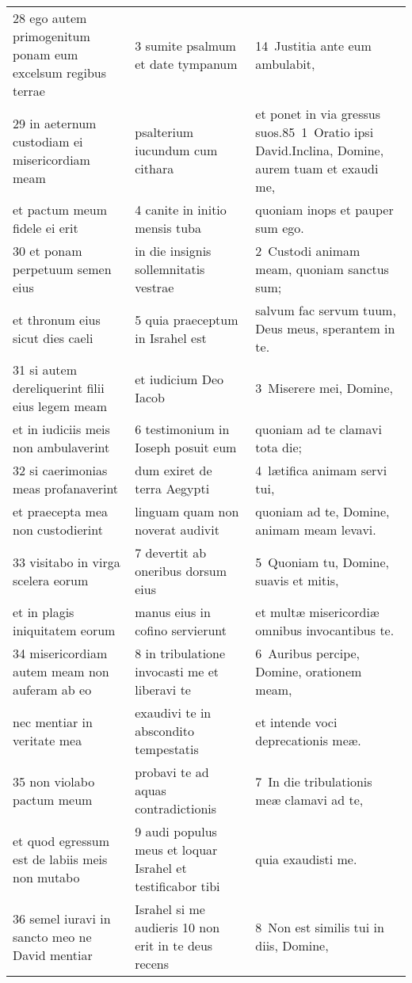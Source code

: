 \documentclass{article}
\begin{document}
\begin{longtable}{@{}p{}p{}p{}@{}}
28 ego autem primogenitum ponam eum excelsum regibus terrae	&	3 sumite psalmum et date tympanum	&	14 Justitia ante eum ambulabit,	\\
29 in aeternum custodiam ei misericordiam meam	&	psalterium iucundum cum cithara	&	et ponet in via gressus suos.85 1 Oratio ipsi David.Inclina, Domine, aurem tuam et exaudi me,	\\
et pactum meum fidele ei erit	&	4 canite in initio mensis tuba	&	quoniam inops et pauper sum ego.	\\
30 et ponam perpetuum semen eius	&	in die insignis sollemnitatis vestrae	&	2 Custodi animam meam, quoniam sanctus sum;	\\
et thronum eius sicut dies caeli	&	5 quia praeceptum in Israhel est	&	salvum fac servum tuum, Deus meus, sperantem in te.	\\
31 si autem dereliquerint filii eius legem meam	&	et iudicium Deo Iacob	&	3 Miserere mei, Domine,	\\
et in iudiciis meis non ambulaverint	&	6 testimonium in Ioseph posuit eum	&	quoniam ad te clamavi tota die;	\\
32 si caerimonias meas profanaverint	&	dum exiret de terra Aegypti	&	4 lætifica animam servi tui,	\\
et praecepta mea non custodierint	&	linguam quam non noverat audivit	&	quoniam ad te, Domine, animam meam levavi.	\\
33 visitabo in virga scelera eorum	&	7 devertit ab oneribus dorsum eius	&	5 Quoniam tu, Domine, suavis et mitis,	\\
et in plagis iniquitatem eorum	&	manus eius in cofino servierunt	&	et multæ misericordiæ omnibus invocantibus te.	\\
34 misericordiam autem meam non auferam ab eo	&	8 in tribulatione invocasti me et liberavi te	&	6 Auribus percipe, Domine, orationem meam,	\\
nec mentiar in veritate mea	&	exaudivi te in abscondito tempestatis	&	et intende voci deprecationis meæ.	\\
35 non violabo pactum meum	&	probavi te ad aquas contradictionis	&	7 In die tribulationis meæ clamavi ad te,	\\
et quod egressum est de labiis meis non mutabo	&	9 audi populus meus et loquar Israhel et testificabor tibi	&	quia exaudisti me.	\\
36 semel iuravi in sancto meo ne David mentiar	&	Israhel si me audieris 10 non erit in te deus recens	&	8 Non est similis tui in diis, Domine,	\\

\end{longtable}
\end{document}
